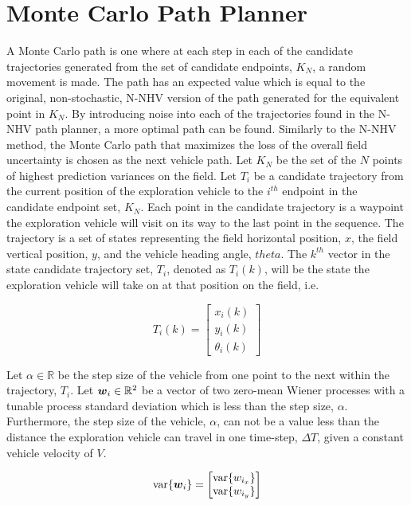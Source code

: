 \section{Monte Carlo Path Planner} \label{sec:mcpp}
A Monte Carlo path is one where at each step in each of the candidate trajectories generated from the set of candidate endpoints, $K_N$, a random movement is made. The path has an expected value which is equal to the original, non-stochastic, N-NHV version of the path generated for the equivalent point in $K_N$. By introducing noise into each of the trajectories found in the N-NHV path planner, a more optimal path can be found. Similarly to the N-NHV method, the Monte Carlo path that maximizes the loss of the overall field uncertainty is chosen as the next vehicle path. Let $K_N$ be the set of the $N$ points of highest prediction variances on the field. Let $T_i$ be a candidate trajectory from the current position of the exploration vehicle to the $i^{th}$ endpoint in the candidate endpoint set, $K_N$. Each point in the candidate trajectory is a waypoint the exploration vehicle will visit on its way to the last point in the sequence. The trajectory is a set of states representing the field horizontal position, $x$, the field vertical position, $y$, and the vehicle heading angle, $theta$. The $k^{th}$ vector in the state candidate trajectory set, $T_i$, denoted as $T_{i}(k)$, will be the state the exploration vehicle will take on at that position on the field, i.e.

\begin{equation}
T_{i}(k) = \begin{bmatrix} x_i(k) \\ y_i(k) \\ \theta_i(k) \end{bmatrix}
\end{equation}

Let $\alpha \in \mathbb{R}$ be the step size of the vehicle from one point to the next within the trajectory, $T_i$. Let ${\it{\boldsymbol{w}}}_i \in \mathbb{R}^2$ be a vector of two zero-mean Wiener processes with a tunable process standard deviation which is less than the step size, $\alpha$. Furthermore, the step size of the vehicle, $\alpha$, can not be a value less than the distance the exploration vehicle can travel in one time-step, $\Delta T$, given a constant vehicle velocity of $V$.

\begin{equation}
\text{var}\{{\it{\boldsymbol{w}}}_i\} = \begin{bmatrix} \text{var}\{w_{i_x}\} \\ \text{var}\{w_{i_y}\} \end{bmatrix}
\end{equation}

